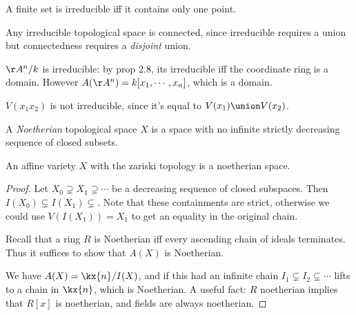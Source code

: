 \begin{example}

A finite set is irreducible iff it contains only one point.

\end{example}

\begin{example}

Any irreducible topological space is connected, since irreducible
requires a union but connectedness requires a \emph{disjoint} union.

\end{example}

\begin{example}

\(\AA^n/k\) is irreducible: by prop 2.8, its irreducible iff the
coordinate ring is a domain. However \(A(\AA^n) = k[x_1, \cdots, x_n]\),
which is a domain.

\end{example}

\begin{example}

\(V(x_1 x_2)\) is not irreducible, since it's equal to
\(V(x_1) \union V(x_2)\).

\end{example}

\begin{definition}

A \emph{Noetherian} topological space \(X\) is a space with no infinite
strictly decreasing sequence of closed subsets.

\end{definition}

\begin{proposition}[?]

An affine variety \(X\) with the zariski topology is a noetherian space.

\end{proposition}

\begin{proof}

Let \(X_0 \supsetneq X_1 \supsetneq \cdots\) be a decreasing sequence of
closed subspaces. Then \(I(X_0) \subsetneq I(X_1) \subsetneq\). Note
that these containments are strict, otherwise we could use
\(V(I(X_1)) = X_1\) to get an equality in the original chain.

Recall that a ring \(R\) is Noetherian iff every ascending chain of
ideals terminates. Thus it suffices to show that \(A(X)\) is Noetherian.

We have \(A(X) = \kx{n} / I(X)\), and if this had an infinite chain
\(I_1 \subsetneq I_2 \subsetneq \cdots\) lifts to a chain in \(\kx{n}\),
which is Noetherian. A useful fact: \(R\) noetherian implies that
\(R[x]\) is noetherian, and fields are always noetherian.

\end{proof}

